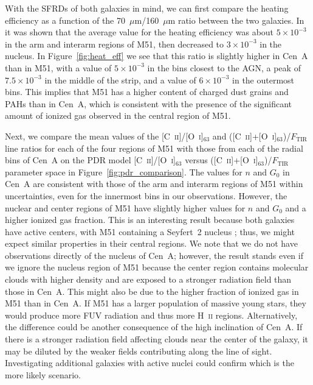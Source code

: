 \documentclass[preprint2]{aastex}
\begin{document}
With the SFRDs of both galaxies in mind, we can first compare the heating efficiency as a function of the 70~$\mu$m/160~$\mu$m ratio between the two galaxies.  In \citet{parkin_2013} it was shown that the average value for the heating efficiency was about $5 \times 10^{-3}$ in the arm and interarm regions of M51, then decreased to $3 \times 10^{-3}$ in the nucleus.  In Figure~\ref{fig:heat_eff} we see that this ratio is slightly higher in Cen~A than in M51, with a value of $5 \times 10^{-3}$ in the bins closest to the AGN, a peak of $7.5 \times 10^{-3}$ in the middle of the strip, and a value of $6 \times 10^{-3}$ in the outermost bins.  This implies that M51 has a higher content of charged dust grains and PAHs than in Cen~A, which is consistent with the presence of the significant amount of ionized gas observed in the central region of M51.

Next, we compare the mean values of the [C~\textsc{ii}]/[O~\textsc{i}]$_{63}$ and ([C~\textsc{ii}]+[O~\textsc{i}]$_{63}$)/$F_{\mathrm{TIR}}$ line ratios for each of the four regions of M51 with those from each of the radial bins of Cen~A on the PDR model [C~\textsc{ii}]/[O~\textsc{i}]$_{63}$ versus ([C~\textsc{ii}]+[O~\textsc{i}]$_{63}$)/$F_{\mathrm{TIR}}$ parameter space in Figure~\ref{fig:pdr_comparison}.  The values for $n$ and $G_{0}$ in Cen~A are consistent with those of the arm and interarm regions of M51 within uncertainties, even for the innermost bins in our observations.  However, the nuclear and center regions of M51 have slightly higher values for $n$ and $G_{0}$ and a higher ionized gas fraction.  This is an interesting result because both galaxies have active centers, with M51 containing a Seyfert~2 nucleus \citep{1997ApJS..112..315H}; thus, we might expect similar properties in their central regions.  We note that we do not have observations directly of the nucleus of Cen~A; however, the result stands even if we ignore the nucleus region of M51 because the center region contains molecular clouds with higher density and are exposed to a stronger radiation field than those in Cen~A.  This might also be due to the higher fraction of ionized gas in M51 than in Cen~A.  If M51 has a larger population of massive young stars, they would produce more FUV radiation and thus more H~\textsc{ii} regions.  Alternatively, the difference could be another consequence of the high inclination of Cen~A.  If there is a stronger radiation field affecting clouds near the center of the galaxy, it may be diluted by the weaker fields contributing along the line of sight.  Investigating additional galaxies with active nuclei could confirm which is the more likely scenario.
\end{document}
